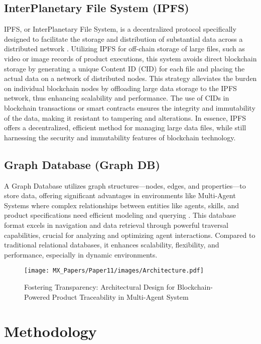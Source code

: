 \begin{bibunit}
\subsection{InterPlanetary File System (IPFS)}
\label{IPFS}

IPFS, or InterPlanetary File System, is a decentralized protocol specifically designed to facilitate the storage and distribution of substantial data across a distributed network \cite{benet2014ipfs}. Utilizing IPFS for off-chain storage of large files, such as video or image records of product executions, this system avoids direct blockchain storage by generating a unique Content ID (CID) for each file and placing the actual data on a network of distributed nodes. This strategy alleviates the burden on individual blockchain nodes by offloading large data storage to the IPFS network, thus enhancing scalability and performance. The use of CIDs in blockchain transactions or smart contracts ensures the integrity and immutability of the data, making it resistant to tampering and alterations. In essence, IPFS offers a decentralized, efficient method for managing large data files, while still harnessing the security and immutability features of blockchain technology.

\subsection{Graph Database (Graph DB)}
\label{graphdb}

A Graph Database utilizes graph structures—nodes, edges, and properties—to store data, offering significant advantages in environments like Multi-Agent Systems where complex relationships between entities like agents, skills, and product specifications need efficient modeling and querying \cite{GraphDBDocumentation}. This database format excels in navigation and data retrieval through powerful traversal capabilities, crucial for analyzing and optimizing agent interactions. Compared to traditional relational databases, it enhances scalability, flexibility, and performance, especially in dynamic environments.


\begin{figure*}[!t]
	\centering
	\texttt{[image: MX\_Papers/Paper11/images/Architecture.pdf]}
	\caption{Fostering Transparency: Architectural Design for Blockchain-Powered Product Traceability in Multi-Agent System}
	\label{fig:architecture}
\end{figure*}


\section{Methodology}
\label{sec:methodology}


\end{bibunit}
